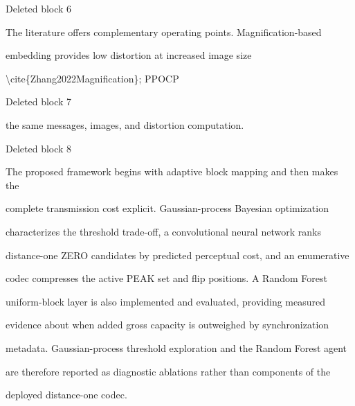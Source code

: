 \documentclass[a4paper,fleqn]{cas-dc}
\newenvironment{RevisionDeletion}{%
  \par\begingroup\color{revisionred}\footnotesize\ttfamily
  \setlength{\parindent}{0pt}\setlength{\parskip}{1pt}\obeyspaces
}{\par\endgroup}
\begin{document}
\begin{RevisionDeletion}
Deleted block 6\par
The literature offers complementary operating points. Magnification-based\par
embedding provides low distortion at increased image size\par
\textbackslash{}cite\{Zhang2022Magnification\}; PPOCP\par
\end{RevisionDeletion}

\begin{RevisionDeletion}
Deleted block 7\par
the same messages, images, and distortion computation.\par
\end{RevisionDeletion}

\begin{RevisionDeletion}
Deleted block 8\par
The proposed framework begins with adaptive block mapping and then makes the\par
complete transmission cost explicit. Gaussian-process Bayesian optimization\par
characterizes the threshold trade-off, a convolutional neural network ranks\par
distance-one ZERO candidates by predicted perceptual cost, and an enumerative\par
codec compresses the active PEAK set and flip positions. A Random Forest\par
uniform-block layer is also implemented and evaluated, providing measured\par
evidence about when added gross capacity is outweighed by synchronization\par
metadata. Gaussian-process threshold exploration and the Random Forest agent\par
are therefore reported as diagnostic ablations rather than components of the\par
deployed distance-one codec.\par
\end{RevisionDeletion}
\end{document}
